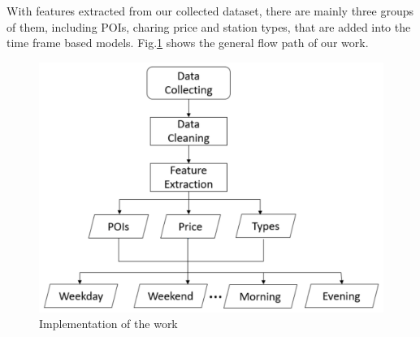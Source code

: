 With features extracted from our collected dataset, there are mainly three groups of them, including POIs, charing price and station types, that are added into the time frame based models. Fig.\ref{fig4} shows the general flow path of our work.

\begin{figure}[!htp]
	\centering
		\includegraphics[width=\columnwidth]{./figures/path.pdf}
	\caption{Implementation of the work}
	\label{fig4}
\end{figure}